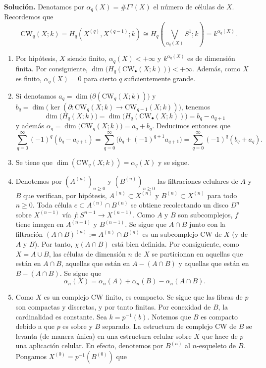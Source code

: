 \documentclass[11pt,a4paper]{article}
\theoremstyle{plain}
\theoremstyle{definition}
\theoremstyle{remark}
\newcommand{\CWq}{\mathrm{CW}}
\begin{document}
\begin{enumerate}[label=\arabic*.,leftmargin=*]
\noindent\textbf{Solución.} Denotamos por $\alpha_q(X)=\#\Gamma^q(X)$ el
número de células de $X$. Recordemos que
\[
\CWq_q(X;k)=H_q(X^{(q)},X^{(q-1)};k)\cong H_q\left(\bigvee_{\alpha_q(X)}S^1;k\right)=k^{\alpha_q(X)}.
\]
\begin{enumerate}[label=\alph*)]
\item Por hipótesis, $X$ siendo finito, $\alpha_q(X)<+\infty$ y
$k^{\alpha_q(X)}$ es de dimensión finita. Por consiguiente,
$\dim\big(H_q(\CWq_\bullet(X;k))\big)<+\infty$. Además, como $X$ es finito,
$\alpha_q(X)=0$ para cierto $q$ suficientemente grande.
\item Si denotamos $a_q=\dim\big(\partial(\CWq_q(X;k))\big)$ y
$b_q=\dim\big(\ker(\partial:\CWq_q(X;k)\to\CWq_{q-1}(X;k))\big)$, tenemos
\[
\dim\big(H_q(X;k)\big)=\dim\big(H_q(\CWq_\bullet(X;k))\big)=b_q-a_{q+1}
\]
y además $\alpha_q=\dim\big(\CWq_q(X;k)\big)=a_q+b_q$. Deducimos entonces
que
\[
\sum_{q=0}^\infty(-1)^q(b_q-a_{q+1})=\sum_{q=0}^\infty\big(b_q+(-1)^{q+1}a_{q+1}\big)=\sum_{q=0}^\infty(-1)^q(b_q+a_q).
\]
\item Se tiene que $\dim(\CWq_q(X;k))=\alpha_q(X)$ y se sigue.
\item Denotemos por $(A^{(n)})_{n\ge0}$ y $(B^{(n)})_{n\ge0}$ las
filtraciones celulares de $A$ y $B$ que verifican, por hipótesis,
$A^{(n)}\subset X^{(n)}$ y $B^{(n)}\subset X^{(n)}$ para todo $n\ge0$. Toda
célula $e\subset A^{(n)}\cap B^{(n)}$ se obtiene recolectando un disco
$D^n$ sobre $X^{(n-1)}$ vía $f:S^{n-1}\to X^{(n-1)}$. Como $A$ y $B$ son
subcomplejos, $f$ tiene imagen en $A^{(n-1)}$ y $B^{(n-1)}$. Se sigue que
$A\cap B$ junto con la filtración $(A\cap B)^{(n)}:=A^{(n)}\cap B^{(n)}$ es
un subcomplejo CW de $X$ (y de $A$ y $B$). Por tanto, $\chi(A\cap B)$ está
bien definida. Por consiguiente, como $X=A\cup B$, las células de
dimensión $n$ de $X$ se particionan en aquellas que están en $A\cap B$,
aquellas que están en $A-(A\cap B)$ y aquellas que están en $B-(A\cap B)$.
Se sigue que
\[
\alpha_n(X)=\alpha_n(A)+\alpha_n(B)-\alpha_n(A\cap B).
\]
\item Como $X$ es un complejo CW finito, es compacto. Se sigue que las
fibras de $p$ son compactas y discretas, y por tanto finitas. Por conexidad
de $B$, la cardinalidad es constante. Sea $k=p^{-1}(b)$. Notemos que $B$ es
compacto debido a que $p$ es sobre y $B$ separado. La estructura de
complejo CW de $B$ se levanta (de manera única) en una estructura celular
sobre $X$ que hace de $p$ una aplicación celular. En efecto, denotemos por
$B^{(n)}$ al $n$-esqueleto de $B$. Pongamos $X^{(0)}=p^{-1}(B^{(0)})$ que

\end{enumerate}
\end{enumerate}
\end{document}

